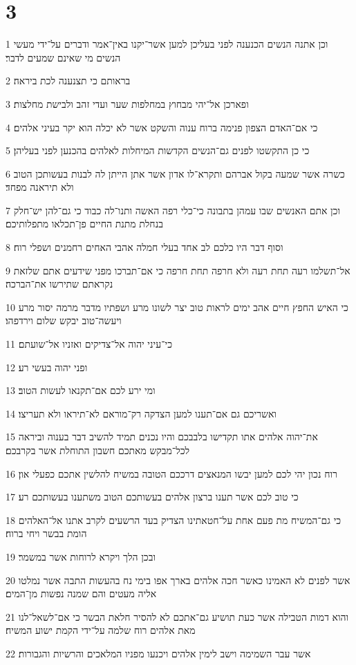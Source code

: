 \chapter{3}

\par 1 וכן אתנה הנשים הכנענה לפני בעליכן למען אשר־יקנו באין־אמר ודברים על־ידי מעשי הנשים מי שאינם שמעים לדבר׃
\par 2 בראותם כי תצנענה לכת ביראה׃
\par 3 ופארכן אל־יהי מבחוץ במחלפות שער ועדי זהב ולבישת מחלצות׃
\par 4 כי אם־האדם הצפון פנימה ברוח ענוה והשקט אשר לא יכלה הוא יקר בעיני אלהים׃
\par 5 כי כן התקשטו לפנים גם־הנשים הקדשות המיחלות לאלהים בהכנען לפני בעליהן׃
\par 6 כשרה אשר שמעה בקול אברהם ותקרא־לו אדון אשר אתן הייתן לה לבנות בעשותכן הטוב ולא תיראנה מפחד׃
\par 7 וכן אתם האנשים שבו עמהן בתבונה כי־כלי רפה האשה ותנו־לה כבוד כי גם־להן יש־חלק בנחלת מתנת החיים פן־תכלאו מתפלותיכם׃
\par 8 וסוף דבר היו כלכם לב אחד בעלי חמלה אהבי האחים רחמנים ושפלי רוח׃
\par 9 אל־תשלמו רעה תחת רעה ולא חרפה תחת חרפה כי אם־תברכו מפני שידעים אתם שלזאת נקראתם שתירשו את־הברכה׃
\par 10 כי האיש החפץ חיים אהב ימים לראות טוב יצר לשונו מרע ושפתיו מדבר מרמה יסור מרע ויעשה־טוב יבקש שלום וירדפהו׃
\par 11 כי־עיני יהוה אל־צדיקים ואזניו אל־שועתם׃
\par 12 ופני יהוה בעשי רע׃
\par 13 ומי ירע לכם אם־תקנאו לעשות הטוב׃
\par 14 ואשריכם גם אם־תענו למען הצדקה רק־מוראם לא־תיראו ולא תעריצו׃
\par 15 את־יהוה אלהים אתו תקדישו בלבבכם והיו נכנים תמיד להשיב דבר בענוה וביראה לכל־מבקש מאתכם חשבון התוחלת אשר בקרבכם׃
\par 16 רוח נכון יהי לכם למען יבשו המנאצים דרככם הטובה במשיח להלשין אתכם כפעלי און׃
\par 17 כי טוב לכם אשר תענו ברצון אלהים בעשותכם הטוב משתענו בעשותכם רע׃
\par 18 כי גם־המשיח מת פעם אחת על־חטאתינו הצדיק בעד הרשעים לקרב אתנו אל־האלהים הומת בבשר ויחי ברוח׃
\par 19 ובכן הלך ויקרא לרוחות אשר במשמר׃
\par 20 אשר לפנים לא האמינו כאשר חכה אלהים בארך אפו בימי נח בהעשות התבה אשר נמלטו אליה מעטים והם שמנה נפשות מן־המים׃
\par 21 והוא דמות הטבילה אשר כעת תושיע גם־אתכם לא להסיר חלאת הבשר כי אם־לשאל־לנו מאת אלהים רוח שלמה על־ידי הקמת ישוע המשיח׃
\par 22 אשר עבר השמימה וישב לימין אלהים ויכנעו מפניו המלאכים והרשיות והגבורות׃


